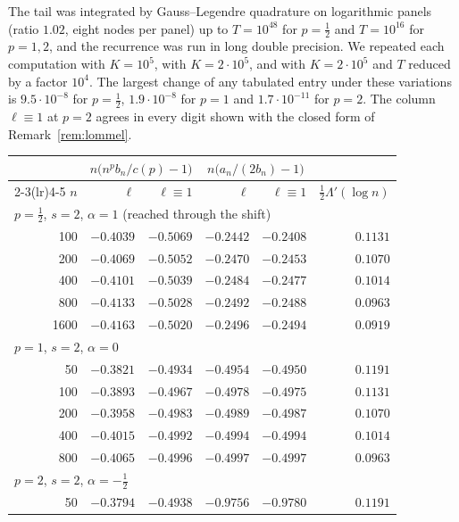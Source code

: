 The tail was integrated by Gauss--Legendre quadrature on logarithmic panels (ratio $1.02$, eight nodes per panel) up to
$T=10^{48}$ for $p=\frac12$ and $T=10^{16}$ for $p=1,2$, and the recurrence was run in long double precision. We
repeated each computation with $K=10^5$, with $K=2\cdot10^5$, and with $K=2\cdot10^5$ and $T$ reduced by a factor
$10^4$. The largest change of any tabulated entry under these variations is $9.5\cdot10^{-8}$ for $p=\frac12$,
$1.9\cdot10^{-8}$ for $p=1$ and $1.7\cdot10^{-11}$ for $p=2$. The column $\ell\equiv1$ at $p=2$ agrees in every digit
shown with the closed form of Remark~\ref{rem:lommel}.

\begin{table}[ht]
\centering
\small
\begin{tabular}{rrrrrr}
\toprule
 & \multicolumn{2}{c}{$n\bigl(n^pb_n/c(p)-1\bigr)$} & \multicolumn{2}{c}{$n\bigl(a_n/(2b_n)-1\bigr)$} & \\
\cmidrule(lr){2-3}\cmidrule(lr){4-5}
$n$ & $\ell$ & $\ell\equiv1$ & $\ell$ & $\ell\equiv1$ & $\frac12\Lambda'(\log n)$\\
\midrule
\multicolumn{6}{l}{$p=\frac12$, $s=2$, $\alpha=1$ (reached through the shift)}\\
 100 & $-0.4039$ & $-0.5069$ & $-0.2442$ & $-0.2408$ & $0.1131$\\
 200 & $-0.4069$ & $-0.5052$ & $-0.2470$ & $-0.2453$ & $0.1070$\\
 400 & $-0.4101$ & $-0.5039$ & $-0.2484$ & $-0.2477$ & $0.1014$\\
 800 & $-0.4133$ & $-0.5028$ & $-0.2492$ & $-0.2488$ & $0.0963$\\
1600 & $-0.4163$ & $-0.5020$ & $-0.2496$ & $-0.2494$ & $0.0919$\\
\midrule
\multicolumn{6}{l}{$p=1$, $s=2$, $\alpha=0$}\\
  50 & $-0.3821$ & $-0.4934$ & $-0.4954$ & $-0.4950$ & $0.1191$\\
 100 & $-0.3893$ & $-0.4967$ & $-0.4978$ & $-0.4975$ & $0.1131$\\
 200 & $-0.3958$ & $-0.4983$ & $-0.4989$ & $-0.4987$ & $0.1070$\\
 400 & $-0.4015$ & $-0.4992$ & $-0.4994$ & $-0.4994$ & $0.1014$\\
 800 & $-0.4065$ & $-0.4996$ & $-0.4997$ & $-0.4997$ & $0.0963$\\
\midrule
\multicolumn{6}{l}{$p=2$, $s=2$, $\alpha=-\frac12$}\\
  50 & $-0.3794$ & $-0.4938$ & $-0.9756$ & $-0.9780$ & $0.1191$\\

\end{tabular}
\end{table}
